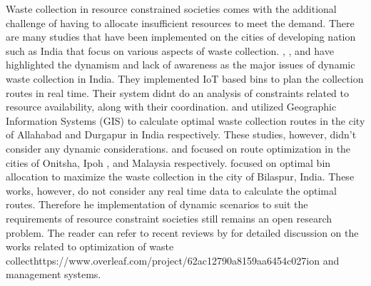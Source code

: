 \documentclass[12pt]{article}
\begin{document}
Waste collection in resource constrained societies comes with the additional challenge of having to allocate insufficient resources to meet the demand. There are many studies that have been implemented on the cities of developing nation such as India that focus on various aspects of waste collection. \cite{dugdhe2016efficient}, \cite{chaudhari2018solid}, and \cite{badve2020garbage} have highlighted the dynamism and lack of awareness as the major issues of dynamic waste collection in India. They implemented IoT based bins to plan the collection routes in real time. Their system didnt do an analysis of constraints related to resource availability, along with their coordination. \cite{chaudhary2019gis} and \cite{sk2020optimal} utilized Geographic Information Systems (GIS) to calculate optimal waste collection routes in the city of Allahabad and Durgapur in India respectively. These studies, however, didn't consider any dynamic considerations.\cite{ogwueleke2009route} and \cite{malakahmad2014solid} focused on route optimization in the cities of Onitsha, Ipoh , and Malaysia respectively.  \cite{rathore2020location} focused on optimal bin allocation to maximize the waste collection in the city of Bilaspur, India. These works, however, do not consider any real time data to calculate the optimal routes. Therefore he implementation of dynamic scenarios to suit the requirements of resource constraint societies still remains an open research problem. The reader can refer to recent reviews by  \cite{belien2014municipal,sulemana2018optimal,abdallah2020artificial} for detailed discussion on the works related to optimization of waste collecthttps://www.overleaf.com/project/62ac12790a8159aa6454c027ion and management systems. 


\end{document}
